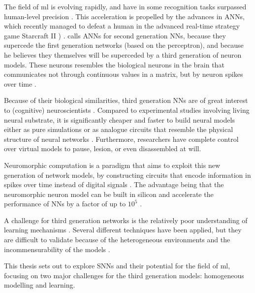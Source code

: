 

The field of \gls{ml} is evolving rapidly, and have in
some recognition tasks surpassed human-level precision
\autocite{Schmidhuber2014}.
This acceleration is propelled by the advances in \gls{ANN}s, 
which recently managed to defeat a human in the
advanced real-time strategy game Starcraft II \cite{DeepMind2019})
\autocite{Schmidhuber2014, Nilsson2009, Russel2007}.
\citeauthor{Maass1997} calls \glspl{ANN} for second generation
\glspl{NN}, because they supercede the first generation networks
(based on the perceptron), and because he believes they themselves will be
superceded by a third generation of neuron models.
These neurons resembles the biological neurons in the brain that communicates
not through continuous values in a matrix, but by neuron spikes over time
\cite{Maass1997}.

Because of their biological similarities, third generation 
\glspl{NN} are of great interest to (cognitive) neuroscientists
\autocite{Dayan2001,Bruderle2011,Eliasmith2015}.
Compared to experimental studies involving living neural substrate,
it is significantly cheaper and faster to build neural 
models either as pure simulations
\autocite{Davison2009, Eliasmith2015} or as analogue circuits
that resemble the physical structure of neural networks
\autocite{Walter2015, Schmitt2017}.
Furthermore, researchers have complete control over virtual models
to pause, lesion, or even disassembled at will.

Neuromorphic computation is a paradigm that aims to exploit this new
generation of network models, by constructing circuits that encode information
in spikes over time instead of digital signals \cite{Eliasmith2015, Albada2018}.
The advantage being that the neuromorphic neuron model can be built in
silicon and accelerate the performance of \glspl{NN} by a factor of up to
$10^5$ \cite{Albada2018, Schmitt2017}.

A challenge for third generation networks is the relatively
poor understanding of learning mechanisms \autocite{Tavanei2015,
Walter2015}.
Several different techniques have been applied, but they are
difficult to validate because of the heterogeneous environments and
the incommensurability of the models \autocite{Bruderle2011, Albada2018}.

This thesis sets out to explore \glspl{SNN} and their potential for the 
field of \gls{ml}, focusing on two major challenges for the
third generation models: homogeneous modelling and learning.
\\[0.1cm]

